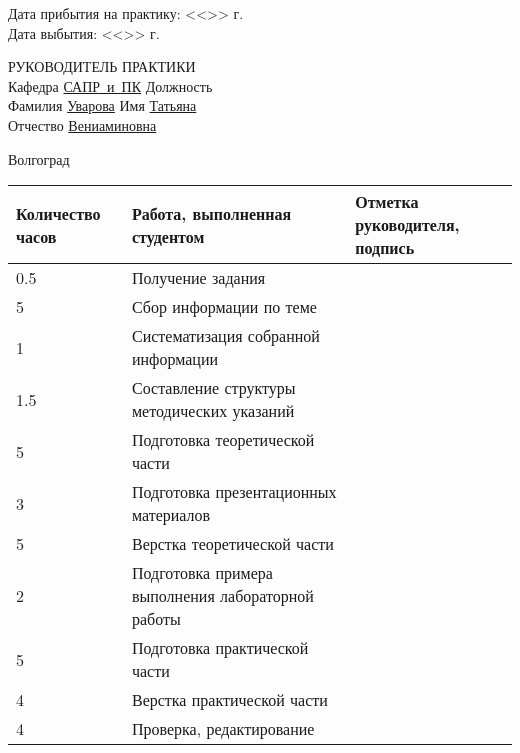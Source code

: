\documentclass[a4paper, 14pt]{extreport}
\begin{document}
\begin{titlepage}
\begin{flushleft}
            Дата прибытия на практику: <<\underline{\hspace{1cm}}>> \underline{\hspace{3cm}} 
            \the\year г.\\
            Дата выбытия: \hspace{3cm}<<\underline{\hspace{1cm}}>> \underline{\hspace{3cm}} 
            \the\year г.
        \end{flushleft}
        \vspace{2cm}
        \begin{flushleft}
            РУКОВОДИТЕЛЬ ПРАКТИКИ\\
            Кафедра \underline{САПР~и~ПК\hspace{2.4cm}} Должность \underline{\hspace{5cm}} \\
            Фамилия \underline{Уварова\hspace{3.15cm}} Имя \underline{Татьяна\hspace{4.85cm}}\\
            Отчество \underline{Вениаминовна\hspace{1.65cm}}
        \end{flushleft}
        \vspace{\fill}
        \begin{center}
            Волгоград \the\year
        \end{center}
    \end{titlepage}
    \begin{table}[h!]
        \centering
        \begin{tabular}{|m{}|m{}|m{}|}
            \hline
            Количество часов & Работа, выполненная студентом & Отметка
            руководителя, подпись \\ \hline
            0.5 & Получение задания & \\ \hline
            5 & Сбор информации по теме & \\ \hline
            1 & Систематизация собранной информации & \\ \hline
            1.5 & Составление структуры методических указаний & \\ \hline
            5 & Подготовка теоретической части & \\ \hline
            3 & Подготовка презентационных материалов & \\ \hline
            5 & Верстка теоретической части & \\ \hline
            2 & Подготовка примера выполнения лабораторной работы & \\ \hline
            5 & Подготовка практической части & \\ \hline
            4 & Верстка практической части & \\ \hline
            4 & Проверка, редактирование & \\ \hline
        \end{tabular}
    \end{table}
\end{document}
